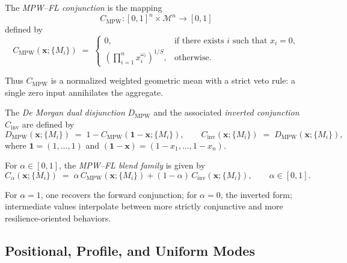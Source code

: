 \documentclass[11pt]{article}
\begin{document}
\begin{definition}
\label{def:mpw-conjunction}
The \emph{MPW--FL conjunction} is the mapping
\[
  C_{\mathrm{MPW}} : [0,1]^n \times \mathcal{M}^n \to [0,1]
\]
defined by
\begin{equation}
  C_{\mathrm{MPW}}(\mathbf{x};\{M_i\}) \;=\;
  \begin{cases}
    0, & \text{if there exists $i$ such that } x_i = 0, \\[4pt]
    \displaystyle\left(\prod_{i=1}^n x_i^{\omega_i}\right)^{1/S}, & \text{otherwise}.
  \end{cases}
  \label{eq:cmpw}
\end{equation}
\end{definition}

Thus $C_{\mathrm{MPW}}$ is a normalized weighted geometric mean with a strict veto rule: a single zero input annihilates the aggregate.

\begin{definition}
\label{def:mpw-disjunction}
The \emph{De Morgan dual disjunction} $D_{\mathrm{MPW}}$ and the associated \emph{inverted conjunction} $C_{\mathrm{inv}}$ are defined by
\begin{equation}
  D_{\mathrm{MPW}}(\mathbf{x};\{M_i\}) \;=\;
  1 - C_{\mathrm{MPW}}(\mathbf{1}-\mathbf{x};\{M_i\}), 
  \qquad
  C_{\mathrm{inv}}(\mathbf{x};\{M_i\}) \;=\; D_{\mathrm{MPW}}(\mathbf{x};\{M_i\}),
  \label{eq:dmpw}
\end{equation}
where $\mathbf{1} = (1,\dots,1)$ and $(\mathbf{1}-\mathbf{x}) = (1-x_1,\dots,1-x_n)$.
\end{definition}

\begin{definition}
\label{def:mpw-blend}
For $\alpha \in [0,1]$, the \emph{MPW--FL blend family} is given by
\begin{equation}
  C_{\alpha}(\mathbf{x};\{M_i\}) \;=\; 
  \alpha\, C_{\mathrm{MPW}}(\mathbf{x};\{M_i\}) 
  + (1-\alpha)\, C_{\mathrm{inv}}(\mathbf{x};\{M_i\}),
  \qquad \alpha \in [0,1].
  \label{eq:blend}
\end{equation}
\end{definition}

For $\alpha=1$, one recovers the forward conjunction; for $\alpha=0$, the inverted form; intermediate values interpolate between more strictly conjunctive and more resilience-oriented behaviors.

\subsection{Positional, Profile, and Uniform Modes}
\label{subsec:modes}
\end{document}
